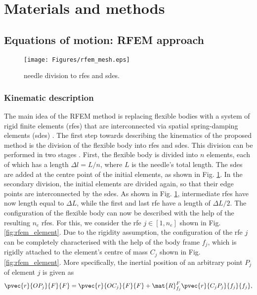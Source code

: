 \section{Materials and methods}
\subsection{Equations of motion: RFEM approach}

\begin{figure}[t]
    \centering
\centering\texttt{[image: Figures/rfem\_mesh.eps]}
    \caption{needle division to rfes and sdes.}
    \label{fig:rfem_mesh}
\end{figure}

\subsubsection{Kinematic description}
The main idea of the RFEM method is replacing flexible bodies with a system of
rigid finite elements (rfes) that are interconnected via spatial spring-damping
elements (sdes) \cite[pp. 35]{wittbrodt2007dynamics}.
The first step towards describing the kinematics of the proposed method is the
division of the flexible body into rfes and sdes. This division can be performed
in two stages \cite[pp. 37-40]{wittbrodt2007dynamics}. First, the flexible body
is divided into $n$ elements, each of which has a length $\Delta l = L / n$, where
$L$ is the needle's total length. The sdes are added at the centre point of
the initial elements, as shown in Fig. \ref{fig:rfem_mesh}. In the secondary
division, the initial elements are divided again, so that their
edge points are interconnected by the sdes. As shown in Fig.
\ref{fig:rfem_mesh}, intermediate rfes have now length equal to $\Delta L$,  while
the first and last rfe have a length of $\Delta L / 2$.
The configuration of the flexible body can now be described with the help of
the resulting $n_e$ rfes. For this,
we consider the rfe $j \in [1, n_e]$ shown in Fig. \ref{fig:rfem_element}.
Due to the rigidity assumption, the configuration of the rfe $j$ can be
completely characterised with the help of the body frame $f_{j}$, which is
rigidly attached to the element's centre of mass $C_{j}$ shown in
Fig. \ref{fig:rfem_element}. More specifically, the inertial position of an
arbitrary point $P_{j}$ of element $j$ is given as 
\begin{equation}
    \pvec{r}{OP_{j}}{F}{F} = \pvec{r}{OC_{j}}{F}{F} + \mat{R}_{f_j}^{F} 
    \pvec{r}{C_{j}P_{j}}{f_{j}}{f_{j}},
   \label{eq:rfem_position} 
\end{equation}
